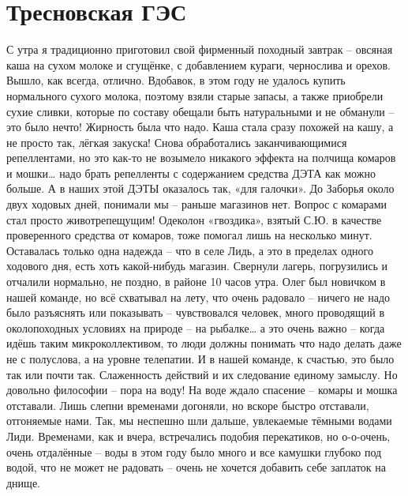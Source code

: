 \chapter{Тресновская ГЭС} 

С утра я традиционно приготовил свой фирменный походный завтрак – овсяная каша на сухом молоке и сгущёнке, с добавлением кураги, чернослива и орехов. Вышло, как всегда, отлично. Вдобавок, в этом году не удалось купить нормального сухого молока, поэтому взяли старые запасы, а также приобрели сухие сливки, которые по составу обещали быть натуральными и не обманули – это было нечто! Жирность была что надо. Каша стала сразу похожей на кашу, а не просто так, лёгкая закуска! 
Снова обработались заканчивающимися репеллентами, но это как-то не возымело никакого эффекта на полчища комаров и мошки… надо брать репелленты с содержанием средства ДЭТА как можно больше. А в наших этой ДЭТЫ оказалось так, «для галочки». До Заборья около двух ходовых дней, понимали мы – раньше магазинов нет. Вопрос с комарами стал просто животрепещущим! Одеколон «гвоздика», взятый С.Ю. в качестве проверенного средства от комаров, тоже помогал лишь на несколько минут. Оставалась только одна надежда – что в селе Лидь, а это в пределах одного ходового дня, есть хоть какой-нибудь магазин.
Свернули лагерь, погрузились и отчалили нормально, не поздно, в районе 10 часов утра. Олег был новичком в нашей команде, но всё схватывал на лету, что очень радовало – ничего не надо было разъяснять или показывать – чувствовался человек, много проводящий в околопоходных условиях на природе – на рыбалке… а это очень важно – когда идёшь таким микроколлективом, то люди должны понимать что надо делать даже не с полуслова, а на уровне телепатии. И в нашей команде, к счастью, это было так или почти так. Слаженность действий и их следование единому замыслу. Но довольно философии – пора на воду!
На воде ждало спасение – комары и мошка отставали. Лишь слепни временами догоняли, но вскоре быстро отставали, отгоняемые нами. Так, мы неспешно шли дальше, увлекаемые тёмными водами Лиди. Временами, как и вчера, встречались подобия перекатиков, но о-о-очень, очень отдалённые – воды в этом году было много и все камушки глубоко под водой, что не может не радовать – очень не хочется добавить себе заплаток на днище. 
